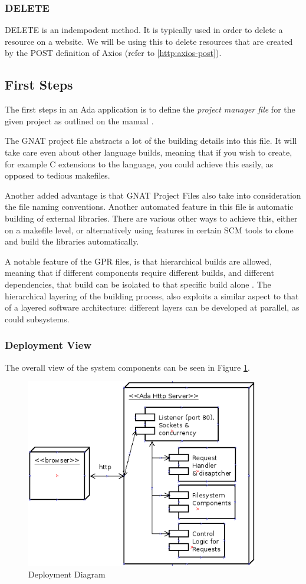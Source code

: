 \subsubsection{DELETE} 
DELETE is an indempodent method. It is typically used in order to delete a
resource on a website.
We will be using this to delete resources that are created by the POST
definition of Axios (refer to \ref{http:axios-post}).

\subsection{First Steps}
The first steps in an Ada application is to define the \textit{project manager
file} for the given project as outlined on the manual \cite{GNATintro}.

The GNAT project file abstracts a lot of the building details into this file.
It will take care even about other language builds, meaning that if you wish to
create, for example C extensions to the language, you could achieve this
easily, as opposed to tedious makefiles. 

Another added advantage is that GNAT Project Files also take into consideration
the file naming conventions. Another automated feature in this file is
automatic building of external libraries. There are various other ways to
achieve this, either on a makefile level, or alternatively using features in
certain SCM tools to clone and build the libraries automatically. 

A notable feature of the GPR files, is that hierarchical builds are allowed,
meaning that if different components require different builds, and different
dependencies, that build can be isolated to that specific build alone
\cite{GNATintro}. The hierarchical layering of the building process, also
exploits a similar aspect to that of a layered software architecture: different
layers can be developed at parallel, as could subsystems. 

\subsubsection{Deployment View}
The overall view of the system components can be seen in Figure \ref{fig:deployment}. 

\begin{figure}[hb]
\centering
\includegraphics[width=4in]{gfx/deployment.png}
\caption{Deployment Diagram}
\label{fig:deployment}
\end{figure}
